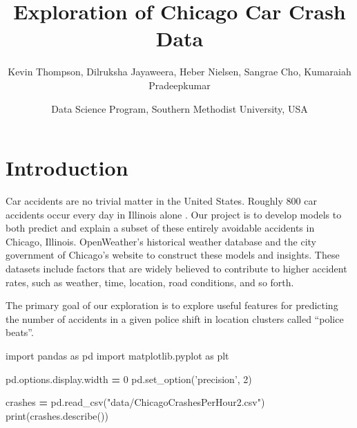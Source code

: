 \documentclass[american,]{article}
\title{Exploration of Chicago Car Crash Data}
\author{Kevin Thompson, Dilruksha Jayaweera, Heber Nielsen, Sangrae Cho,
Kumaraiah Pradeepkumar}
\date{Data Science Program, Southern Methodist University, USA \break}
\newenvironment{Shaded}{\begin{snugshade}}{\end{snugshade}}
\newcommand{\DecValTok}[1]{\textcolor[rgb]{0.00,0.00,0.81}{#1}}
\newcommand{\StringTok}[1]{\textcolor[rgb]{0.31,0.60,0.02}{#1}}
\newcommand{\ImportTok}[1]{#1}
\newcommand{\OperatorTok}[1]{\textcolor[rgb]{0.81,0.36,0.00}{\textbf{#1}}}
\newcommand{\BuiltInTok}[1]{#1}
\newcommand{\NormalTok}[1]{#1}
\begin{document}
\maketitle

\section{Introduction}

Car accidents are no trivial matter in the United States. Roughly 800
car accidents occur every day in Illinois alone \citep{tribune}. Our
project is to develop models to both predict and explain a subset of
these entirely avoidable accidents in Chicago, Illinois. OpenWeather's
historical weather database and the city government of Chicago's website
to construct these models and insights. These datasets include factors
that are widely believed to contribute to higher accident rates, such as
weather, time, location, road conditions, and so forth.

The primary goal of our exploration is to explore useful features for
predicting the number of accidents in a given police shift in location
clusters called ``police beats''.

\begin{Shaded}
\begin{Highlighting}[]
\ImportTok{import}\NormalTok{ pandas }\ImportTok{as}\NormalTok{ pd}
\ImportTok{import}\NormalTok{ matplotlib.pyplot }\ImportTok{as}\NormalTok{ plt }

\NormalTok{pd.options.display.width }\OperatorTok{=} \DecValTok{0}
\NormalTok{pd.set_option(}\StringTok{'precision'}\NormalTok{, }\DecValTok{2}\NormalTok{)}

\NormalTok{crashes }\OperatorTok{=}\NormalTok{ pd.read_csv(}\StringTok{"data/ChicagoCrashesPerHour2.csv"}\NormalTok{)}
\BuiltInTok{print}\NormalTok{(crashes.describe())}
\end{Highlighting}
\end{Shaded}
\end{document}
